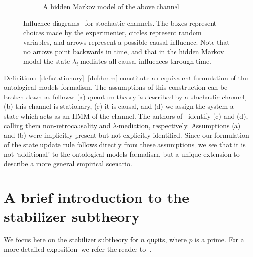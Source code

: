 \documentclass[%
 reprint, onecolumn, 12pt,
superscriptaddress,
nofootinbib,
 prx, 
]{quantumarticle}
\begin{document}
\begin{figure}
\begin{subfigure}[t]{0.48\textwidth}
    \caption{A hidden Markov model of the above channel}
    \label{fig:hmm} 
  \end{subfigure}

  \caption{Influence diagrams~\cite{HowardInfluenceDiagrams2005} for
    stochastic channels. The boxes represent choices made by the
    experimenter, circles represent random variables, and arrows
    represent a possible causal influence. Note that no arrows point
    backwards in time, and that in the hidden Markov model the state
    $\lambda_t$ mediates all causal influences through time.}
  \label{fig:influence-diagram}
\end{figure}


Definitions~\ref{def:stationary}--\ref{def:hmm} constitute an
equivalent formulation of the ontological models formalism. The
assumptions of this construction can be broken down as follows: (a)
quantum theory is described by a stochastic channel, (b) this channel
is stationary, (c) it is causal, and (d) we assign the system a state
which acts as an HMM of the channel. The authors
of~\cite{Leifertimesymmetricinterpretation2017} identify (c) and (d),
calling them non-retrocausality and $\lambda$-mediation,
respectively. Assumptions (a) and (b) were implicitly present but not
explicitly identified. Since our formulation of the state update rule
follows directly from these assumptions, we see that it is not
`additional' to the ontological models formalism, but a unique
extension to describe a more general empirical scenario.
 

\section{A brief introduction to the stabilizer subtheory}
\label{sec:wigner-intro}
We focus here on the stabilizer subtheory for $n$ qu$p$its, where $p$
is a prime. For a more detailed exposition, we refer the reader
to~\cite{GrossHudsonTheoremfinitedimensional2006,VeitchResourceTheoryStabilizer2014}.
\end{document}
